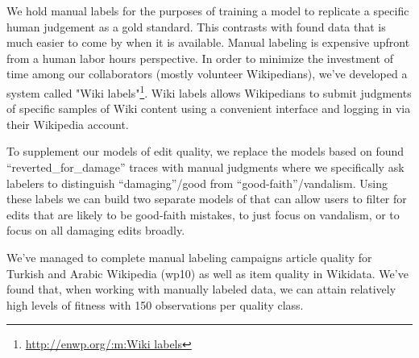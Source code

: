 
We hold manual labels for the purposes of training a model to replicate a specific human judgement as a gold standard.  This contrasts with found data that is much easier to come by when it is available.  Manual labeling is expensive upfront from a human labor hours perspective.  In order to minimize the investment of time among our collaborators (mostly volunteer Wikipedians), we've developed a system called "Wiki labels"\footnote{\url{http://enwp.org/:m:Wiki labels}}.  Wiki labels allows Wikipedians to submit judgments of specific samples of Wiki content using a convenient interface and logging in via their Wikipedia account.

To supplement our models of edit quality, we replace the models based on found ``reverted\_for\_damage'' traces with manual judgments where we specifically ask labelers to distinguish ``damaging''/good from ``good-faith''/vandalism.  Using these labels we can build two separate models of that can allow users to filter for edits that are likely to be good-faith mistakes\cite{halfaker2017automated}, to just focus on vandalism, or to focus on all damaging edits broadly.

We've managed to complete manual labeling campaigns article quality for Turkish and Arabic Wikipedia (wp10) as well as item quality in Wikidata.  We've found that, when working with manually labeled data, we can attain relatively high levels of fitness with 150 observations per quality class.

